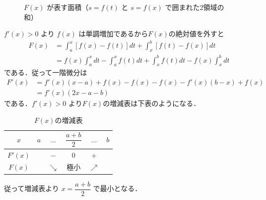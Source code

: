 \documentclass[../../main.tex]{subfiles}
\begin{document}
\begin{figure}[htb]
\begin{center}
  \end{center}
  \caption{$F(x)$ が表す面積（$s=f(t)$ と $s=f(x)$ で囲まれた2領域の和）}
\end{figure}

$f'(x)>0$ より $f(x)$ は単調増加であるから$F(x)$の絶対値を外すと
\begin{align}
  F(x)
  &= \int_a^x [f(x)-f(t)]dt + \int_x^b[f(t)-f(x)]dt \\
  &= f(x)\int_a^x dt - \int_a^x f(t)dt + \int_x^b f(t)dt - f(x)\int_x^b dt
\end{align}
である．従って一階微分は
\begin{align}
  F'(x)
  &= f'(x)(x-a) + f(x) - f(x) - f(x) - f'(x)(b-x) + f(x) \\
  &= f'(x)(2x-a-b)
\end{align}
である．$f'(x)>0$ より$F(x)$の増減表は下表のようになる．

\begin{table}[htb]
  \centering
  \caption{$F(x)$の増減表}
  \begin{tabular}{c|ccccc}
    $x$ & $a$ & $\dots$ & $\dfrac{a+b}{2}$ & $\dots$ & $b$ \\
    \hline
    $F'(x)$ & & $-$ & $0$ & $+$ & \\
    \hline
    $F(x)$ & & $\searrow$ & 極小 & $\nearrow$ &
  \end{tabular}
\end{table}

従って増減表より $x=\dfrac{a+b}{2}$ で最小となる．

\newpage
\end{document}
